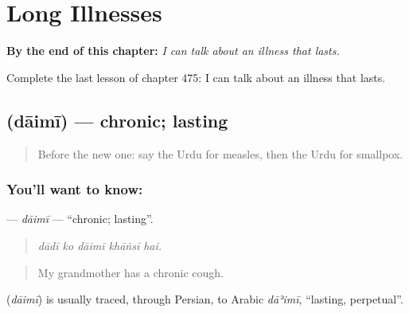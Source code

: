 
\chapter{Long Illnesses}
\label{ch:ur-long-illnesses}

\begin{chapteropening}
\textbf{By the end of this chapter:} \emph{I can talk about an illness that lasts.}

Complete the last lesson of chapter 475: I can talk about an illness that lasts.
\end{chapteropening}

\section[\texorpdfstring{\ur{دائمی} (dāimī)}{دائمی (dāimī)}]{ (dāimī) — chronic; lasting}

\label{lesson:UR-C475-daimi}



\begin{quote}
Before the new one: say the Urdu for measles, then the Urdu for smallpox.
\end{quote}

\subsection*{You'll want to know: }
\textbf{} — \emph{dāimī} — \textquotedblleft{}chronic; lasting\textquotedblright{}.

\begin{quote}
    
\end{quote}

\begin{quote}
\emph{dādī ko dāimī khāṅsī hai.}
\end{quote}

\begin{quote}
My grandmother has a chronic cough.
\end{quote}

\begin{cousinweb}
\textbf{} (\emph{dāimī}) is usually traced, through Persian, to Arabic \emph{dāʾimī}, \textquotedblleft{}lasting, perpetual\textquotedblright{}.
\end{cousinweb}

